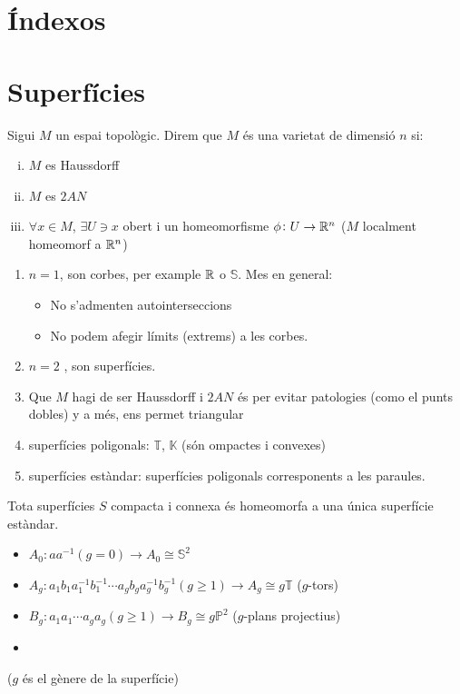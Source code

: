 \section{Índexos}


\section{Superfícies}

\begin{defi}[Varietat]
    Sigui $M$ un espai topològic. Direm que $M$ és una varietat de dimensió $n$ si:
    \begin{enumerate}[i)]
	\item $M$ es Haussdorff
	\item $M$ es $2AN$
	\item $\forall x \in M$, $\exists U \ni x$ obert i un homeomorfisme
	    $\phi \colon U \to \mathbb{R}^n$ ($M$ localment homeomorf a $\mathbb{R}^n$)
    \end{enumerate}
\end{defi}

\begin{example}
    \begin{enumerate}
	\item $n = 1$, son corbes, per example $\mathbb{R}$ o $\mathbb{S}$. Mes en general:
	    \begin{itemize}
		\item No s'admenten autointerseccions
		\item No podem afegir límits (extrems) a les corbes.
	    \end{itemize}
	\item $n = 2$ , son superfícies.
	\item Que $M$ hagi de ser Haussdorff i $2AN$ és per evitar patologies (como el punts
	    dobles) y a més, ens permet triangular
	\item superfícies poligonals: $\mathbb{T}$, $\mathbb{K}$ (són ompactes i convexes)
	\item superfícies estàndar: superfícies poligonals corresponents a les paraules.
    \end{enumerate}
\end{example}

\begin{teo*}[C]
    Tota superfícies $S$ compacta i connexa és homeomorfa a una única superfície estàndar.
    \begin{itemize}
	\item $A_0 \colon aa^{-1} (g = 0) \rightarrow A_0 \cong \mathbb{S}^2$
	\item $A_g \colon a_1b_1a^{-1}_1 b^{-1}_1 \cdots a_gb_ga^{-1}_gb^{-1}_g (g \geq 1)
	    \rightarrow A_g \cong g \mathbb{T}$ ($g$-tors)
	\item $B_g \colon a_1a_1 \cdots a_ga_g (g \geq 1) \rightarrow B_g \cong g \mathbb{P}^2$
	    ($g$-plans projectius)
	\item
    \end{itemize}
    ($g$ és el gènere de la superfície)
\end{teo*}

